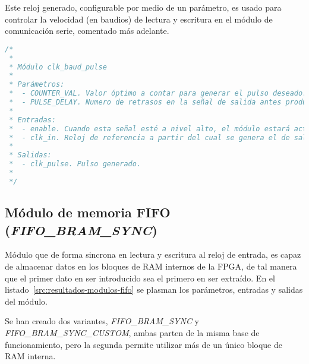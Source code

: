 Este reloj generado, configurable por medio de un parámetro, es usado para controlar la velocidad (en baudios) de lectura y escritura en el módulo de comunicación serie, comentado más adelante.

\begin{lstlisting}[language=Verilog,
    caption={Parámetros, entradas y salidas del módulo clk\_baud\_pulse.},
    label=src:resultados-modulos-clk-baud-pulse]
/*
 *
 * Módulo clk_baud_pulse
 *
 * Parámetros:
 *  - COUNTER_VAL. Valor óptimo a contar para generar el pulso deseado.
 *  - PULSE_DELAY. Numero de retrasos en la señal de salida antes producir un pulso.
 *
 * Entradas:
 *  - enable. Cuando esta señal esté a nivel alto, el módulo estará activo, y en caso contrario la salida estará siempre a nivel bajo, reiniciando además sus registros internos.
 *  - clk_in. Reloj de referencia a partir del cual se genera el de salida.
 *
 * Salidas:
 *  - clk_pulse. Pulso generado.
 *
 */
\end{lstlisting}


\subsection{Módulo de memoria FIFO (\emph{FIFO\_BRAM\_SYNC})}
Módulo que de forma sincrona en lectura y escritura al reloj de entrada, es capaz de almacenar datos en los bloques de RAM internos de la FPGA, de tal manera que el primer dato en ser introducido sea el primero en ser extraído. En el listado~\ref{src:resultados-modulos-fifo} se plasman los parámetros, entradas y salidas del módulo.

Se han creado dos variantes, \emph{FIFO\_BRAM\_SYNC} y \emph{FIFO\_BRAM\_SYNC\_CUSTOM}, ambas parten de la misma base de funcionamiento, pero la segunda permite utilizar más de un único bloque de RAM interna.

